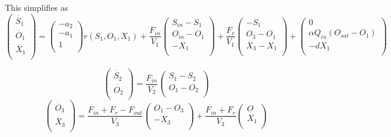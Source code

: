 This simplifies as 
$$\begin{pmatrix}
\dot{S_{1}}\\
\dot{O_{1}}\\
\dot{X_{1}}\\
\end{pmatrix}=\begin{pmatrix}
-a_{2}\\
-a_{1}\\
1\\
\end{pmatrix}
r(S_{1},O_{1},X_{1})+\dfrac{F_{in}}{V_{1}}\begin{pmatrix}
S_{in}-S_{1}\\
O_{in}-O_{1}\\
-X_{1}\\
\end{pmatrix}+
\dfrac{F_{r}}{V_{1}}
\begin{pmatrix}
-S_{1}\\
O_{3}-O_{1}\\
X_{3}-X_{1}\\
\end{pmatrix}+
\begin{pmatrix}
0\\
\alpha Q_{in}(O_{sat}-O_{1})\\
-dX_{1}\\
\end{pmatrix}$$

$$\begin{pmatrix}
\dot{S_{2}}\\
\dot{O_{2}}\\
\end{pmatrix}=
\dfrac{F_{in}}{V_{2}}\begin{pmatrix}
S_{1}-S_{2}\\
O_{1}-O_{2}\\
\end{pmatrix}$$
$$\begin{pmatrix}
\dot{O_{3}}\\
\dot{X_{3}}\\
\end{pmatrix}=
\dfrac{F_{in}+F_{r}-F_{out}}{V_{3}}\begin{pmatrix}
O_{1}-O_{3}\\
-X_{3}\\
\end{pmatrix}+
\dfrac{F_{in}+F_{r}}{V_{3}}
\begin{pmatrix}
O\\
X_{1}\\
\end{pmatrix}
$$




